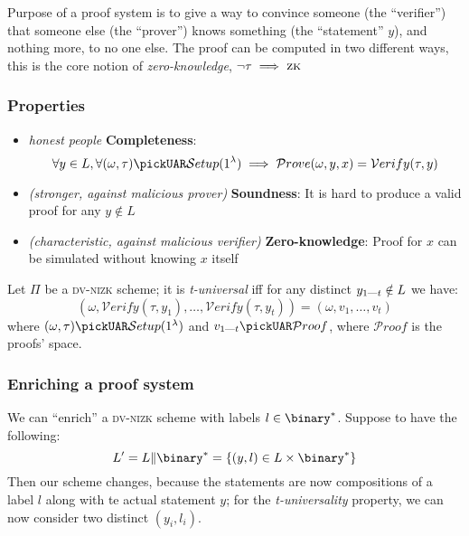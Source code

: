 Purpose of a proof system is to give a way to convince someone (the ``verifier'') that someone else (the ``prover'') knows something (the ``statement'' $y$), and nothing more, to no one else. The proof can be computed in two different ways, this is the core notion of \emph{zero-knowledge}, $\neg \tau \implies \textsc{zk}$

\subsubsection{Properties}

\begin{itemize}
    \item \textit{honest people} \textbf{Completeness}:
    \[
        \forall y \in L, \forall (\omega, \tau) \pickUAR \mathcal{S}etup(1^\lambda) \implies \mathcal{P}rove(\omega, y, x) = \mathcal{V}erify(\tau, y)
    \]
    \item \textit{(stronger, against malicious prover)} \textbf{Soundness}: It is hard to produce a valid proof for any $y \notin L$
    \item \textit{(characteristic, against malicious verifier)} \textbf{Zero-knowledge}: Proof for $x$ can be simulated without knowing $x$ itself
\end{itemize}


\begin{definition}
    Let $\Pi$ be a \textsc{dv-nizk} scheme; it is \textit{t-universal} iff for any distinct $y_{1 \text{---} t} \notin L$ we have: 
    \[
        (\omega, \mathcal{V}erify(\tau, y_1), \ldots, \mathcal{V}erify(\tau, y_{t})) = (\omega, v_1, \ldots, v_t)
    \]
    where $(\omega, \tau) \pickUAR \mathcal{S}etup(1^\lambda)$ and $v_{1 \upto t} \pickUAR \mathcal{P}roof$, where $\mathcal{P}roof$ is the proofs' space.
\end{definition}

\subsubsection{Enriching a proof system}

We can ``enrich'' a \textsc{dv-nizk} scheme with labels $l \in \binary^*$. Suppose to have the following:
\[
    L' = L \| \binary^* = \{(y, l) \in L \times \binary^*\}
\]
Then our scheme changes, because the statements are now compositions of a label $l$ along with te actual statement $y$; for the \textit{t-universality} property, we can now consider two distinct $(y_i, l_i)$.


